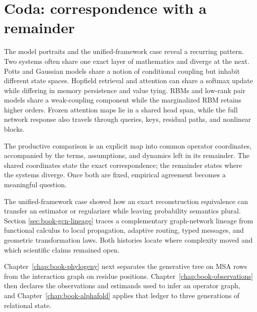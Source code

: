 \section*{Coda: correspondence with a remainder}

The model portraits and the unified-framework case reveal a recurring pattern.  Two systems often share one exact layer of
mathematics and diverge at the next.  Potts and Gaussian models share a notion of conditional
coupling but inhabit different state spaces.  Hopfield retrieval and attention can share a
softmax update while differing in memory persistence and value tying.  RBMs and low-rank pair
models share a weak-coupling component while the marginalized RBM retains higher orders.  Frozen
attention maps lie in a shared head span, while the full network response also travels through
queries, keys, residual paths, and nonlinear blocks.

The productive comparison is an explicit map into common operator coordinates, accompanied by the
terms, assumptions, and dynamics left in its remainder.  The shared coordinates state the exact
correspondence; the remainder states where the systems diverge.  Once both are fixed, empirical
agreement becomes a meaningful question.

The unified-framework case showed how an exact reconstruction equivalence can transfer an estimator
or regularizer while leaving probability semantics plural.  Section
\ref{sec:book-gcn-lineage} traces a complementary graph-network lineage from functional calculus to
local propagation, adaptive routing, typed messages, and geometric transformation laws.  Both
histories locate where complexity moved and which scientific claims remained open.

Chapter~\ref{chap:book-phylogeny} next separates the generative tree on MSA rows from the interaction
graph on residue positions.  Chapter~\ref{chap:book-observations} then declares the observations and
estimands used to infer an operator graph, and Chapter~\ref{chap:book-alphafold} applies that ledger
to three generations of relational state.
